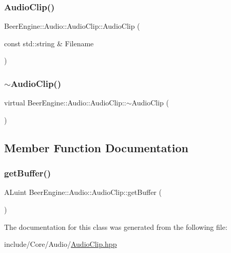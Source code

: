 \subsubsection{\texorpdfstring{Audio\+Clip()}{AudioClip()}}
{\footnotesize\ttfamily Beer\+Engine\+::\+Audio\+::\+Audio\+Clip\+::\+Audio\+Clip (\begin{DoxyParamCaption}\item[{const std\+::string \&}]{Filename }\end{DoxyParamCaption})}

\mbox{\label{class_beer_engine_1_1_audio_1_1_audio_clip_a3ccd8ba4bcb6652acaaa05a8313be1b2}} 
\subsubsection{\texorpdfstring{$\sim$\+Audio\+Clip()}{~AudioClip()}}
{\footnotesize\ttfamily virtual Beer\+Engine\+::\+Audio\+::\+Audio\+Clip\+::$\sim$\+Audio\+Clip (\begin{DoxyParamCaption}{ }\end{DoxyParamCaption})\hspace{0.3cm}{\ttfamily [virtual]}}



\subsection{Member Function Documentation}
\mbox{\label{class_beer_engine_1_1_audio_1_1_audio_clip_a02ffa4d4a75311f1a4d59b49e236a07e}} 
\subsubsection{\texorpdfstring{get\+Buffer()}{getBuffer()}}
{\footnotesize\ttfamily A\+Luint Beer\+Engine\+::\+Audio\+::\+Audio\+Clip\+::get\+Buffer (\begin{DoxyParamCaption}{ }\end{DoxyParamCaption})}



The documentation for this class was generated from the following file\+:\begin{DoxyCompactItemize}
\item 
include/\+Core/\+Audio/\mbox{\hyperlink{_audio_clip_8hpp}{Audio\+Clip.\+hpp}}\end{DoxyCompactItemize}
